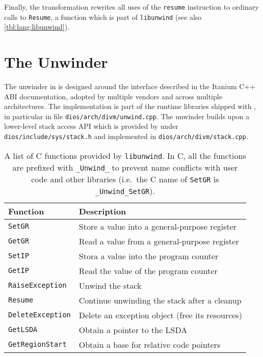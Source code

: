 Finally, the transformation rewrites all uses of the \texttt{resume}
instruction to ordinary calls to \texttt{Resume}, a function which is
part of \texttt{libunwind} (see also \autoref{tbl:lang:libunwind}).

\section{The Unwinder}\label{sec:lang:unwinder}

The unwinder in \divine{} is designed around the interface described in the
Itanium C++ ABI documentation,
adopted by multiple vendors and across multiple architectures. The
implementation is part of the runtime libraries shipped with
\divine{}, in particular in file \texttt{dios/arch/divm/unwind.cpp}.
The
unwinder builds upon a lower-level stack access API which is provided by
\dios{} under \texttt{dios\slash{}include\slash{}sys\slash{}stack.h} and implemented in \texttt{dios\slash{}arch\slash{}divm\slash{}stack.cpp}.

\begin{table}[tp]
\caption{A list of C functions provided by \texttt{libunwind}. In C, all the
functions are prefixed with \texttt{\_Unwind\_} to prevent name conflicts with
user code and other libraries (i.e.~the C name of \texttt{SetGR} is
\texttt{\_Unwind\_SetGR}). }\label{tbl:lang:libunwind}

\begin{tabularx}{\textwidth}{lL}
\toprule
Function & Description\\
\midrule
\texttt{SetGR} & Store a value into a general-purpose register\\
\texttt{GetGR} & Read a value from a general-purpose register\\
\texttt{SetIP} & Stora a value into the program counter\\
\texttt{GetIP} & Read the value of the program counter\\
\texttt{RaiseException} & Unwind the stack\\
\texttt{Resume} & Continue unwinding the stack after a cleanup\\
\texttt{DeleteException} & Delete an exception object (free its resources)\\
\texttt{GetLSDA} & Obtain a pointer to the LSDA\\
\texttt{GetRegionStart} & Obtain a base for relative code pointers\\
\bottomrule
\end{tabularx}
\end{table}

